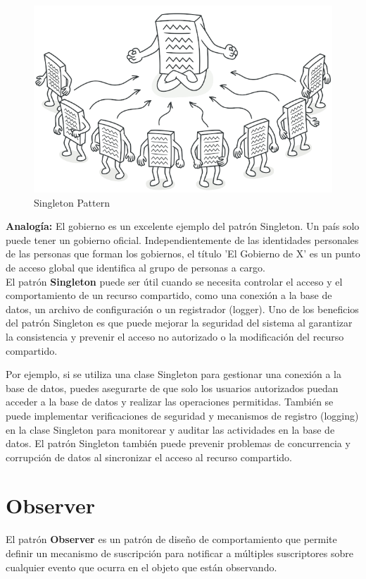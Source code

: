 \begin{figure}[H]
    \centering
    \includegraphics[width=0.5\linewidth]{PatronesSoftware/singleton.png}
    \caption{Singleton Pattern}
    \label{fig:singleton-pattern}
\end{figure}


\textbf{Analogía: }El gobierno es un excelente ejemplo del patrón Singleton. Un país solo puede tener un gobierno oficial. Independientemente de las identidades personales de las personas que forman los gobiernos, el título 'El Gobierno de X' es un punto de acceso global que identifica al grupo de personas a cargo. \\

El patrón \textbf{Singleton} puede ser útil cuando se necesita controlar el acceso y el comportamiento de un recurso compartido, como una conexión a la base de datos, un archivo de configuración o un registrador (logger). Uno de los beneficios del patrón Singleton es que puede mejorar la seguridad del sistema al garantizar la consistencia y prevenir el acceso no autorizado o la modificación del recurso compartido. 

Por ejemplo, si se utiliza una clase Singleton para gestionar una conexión a la base de datos, puedes asegurarte de que solo los usuarios autorizados puedan acceder a la base de datos y realizar las operaciones permitidas. También se puede implementar verificaciones de seguridad y mecanismos de registro (logging) en la clase Singleton para monitorear y auditar las actividades en la base de datos. El patrón Singleton también puede prevenir problemas de concurrencia y corrupción de datos al sincronizar el acceso al recurso compartido.


\section{Observer}

El patrón \textbf{Observer} es un patrón de diseño de comportamiento que permite definir un mecanismo de suscripción para notificar a múltiples suscriptores sobre cualquier evento que ocurra en el objeto que están observando. 

